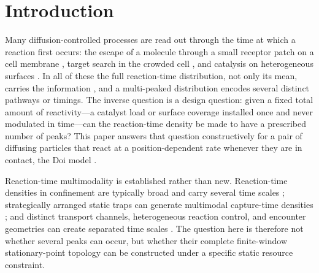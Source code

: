 \documentclass[aps,physrev,reprint,amsmath,amssymb,longbibliography,floatfix]{revtex4-2}
\begin{document}
\section{Introduction}
\label{sec:introduction}

Many diffusion-controlled processes
\cite{smoluchowski1917,collinsKimball1949,redner2001guide,metzlerOshaninRedner2014}
are read out through the time at which a reaction first occurs: the escape
of a molecule through a small receptor patch on a cell membrane
\cite{schussSingerHolcman2007,holcmanSchuss2014narrow}, target search in the
crowded cell
\cite{condaminEtAl2007nature,benichouVoituriez2014geometry,bressloffNewby2013,grebenkovMetzlerOshanin2018pccp},
and catalysis on heterogeneous surfaces \cite{grebenkov2019heterogeneous}.
In all of these the full reaction-time distribution, not only its mean,
carries the information
\cite{mattosEtAl2012bounded,godecMetzler2016PRX,godecMetzler2016SciRep}, and
a multi-peaked distribution encodes several distinct pathways or timings.
The inverse question is a design question: given a fixed total amount of
reactivity---a catalyst load or surface coverage installed once and never
modulated in time---can the reaction-time density be made to have a
prescribed number of peaks?  This paper answers that question constructively
for a pair of diffusing particles that react at a position-dependent rate
whenever they are in contact, the Doi model
\cite{doi1976stochastic,teramotoShigesada1967,erbanChapman2009}.

Reaction-time multimodality is established rather than new.  Reaction-time
densities in confinement are typically broad and carry several time scales
\cite{brayMajumdarSchehr2013persistence,mattosEtAl2012bounded};
strategically arranged static traps can generate multimodal capture-time
densities \cite{lindsaySpoonmoreTzou2016narrow}; and distinct transport
channels, heterogeneous reaction control, and encounter geometries can create
separated time scales
\cite{godecMetzler2017twochannel,godecMetzler2016SciRep,grebenkovMetzlerOshanin2018defocusing,grebenkovMetzlerOshanin2019njp,leVotEtAl2022encounter}.
The question here is therefore not whether several peaks can occur, but whether their
complete finite-window stationary-point topology can be constructed under a
specific static resource constraint.
\end{document}
